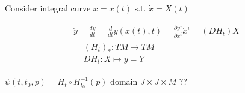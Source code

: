 Consider integral curve $x = x(t)$ s.t. $\dot{x} = X(t)$ 

\[
\begin{gathered}
  \dot{y} = \frac{dy}{dt} = \frac{d}{dt} y(x(t),t) = \frac{ \partial y^j}{ \partial x^i }\dot{x}^i = (DH_t)X \\
\begin{aligned}
  & (H_t)_* : TM \to TM \\ 
  & DH_t : X \mapsto \dot{y} = Y
\end{aligned}
\end{gathered}
\]



$\psi(t,t_0,p) = H_t \circ H_{t_0}^{-1}(p)$ domain $J \times J \times M$ ??

